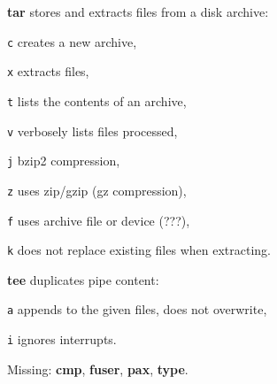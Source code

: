 \begin{enumx}
	\item [\cmd] \textbf{tar} stores and extracts files from a disk archive:
	\item [\texttt{c}] creates a new archive,
	\item [\texttt{x}] extracts files,
	\item [\texttt{t}] lists the contents of an archive,
	\item [\texttt{v}] verbosely lists files processed,
	\item [\texttt{j}] bzip2 compression,
	\item [\texttt{z}] uses zip/gzip (gz compression),
	\item [\texttt{f}] uses archive file or device (???),
	\item [\texttt{k}] does not replace existing files when extracting.
\end{enumx}

\begin{enumx}
	\item [\cmdblack] \textbf{tee} duplicates pipe content: %
	\item [\texttt{a}] appends to the given files, does not overwrite,
	\item [\texttt{i}] ignores interrupts.
\end{enumx}

\begin{enumx}
	\item [\cmd] Missing: \textbf{cmp}, \textbf{fuser}, \textbf{pax}, \textbf{type}.
\end{enumx}
